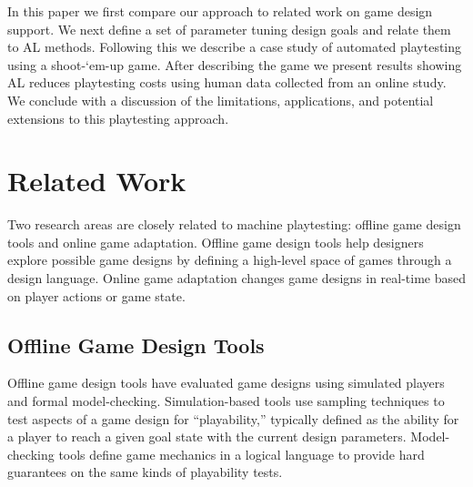\documentclass{sig-alternate}
\begin{document}
In this paper we first compare our approach to related work on game design support.
We next define a set of parameter tuning design goals and relate them to AL methods.
Following this we describe a case study of automated playtesting using a shoot-`em-up game.
After describing the game we present results showing AL reduces playtesting costs using human data collected from an online study.
We conclude with a discussion of the limitations, applications, and potential extensions to this playtesting approach.




\section{Related Work}

Two research areas are closely related to machine playtesting: offline game design tools and online game adaptation.
Offline game design tools help designers explore possible game designs by defining a high-level space of games through a design language.
Online game adaptation changes game designs in real-time based on player actions or game state.



\subsection{Offline Game Design Tools}
Offline game design tools have evaluated game designs using simulated players and formal model-checking.
Simulation-based tools use sampling techniques to test aspects of a game design for ``playability,'' typically defined as the ability for a player to reach a given goal state with the current design parameters.
Model-checking tools define game mechanics in a logical language to provide hard guarantees on the same kinds of playability tests.
\end{document}

